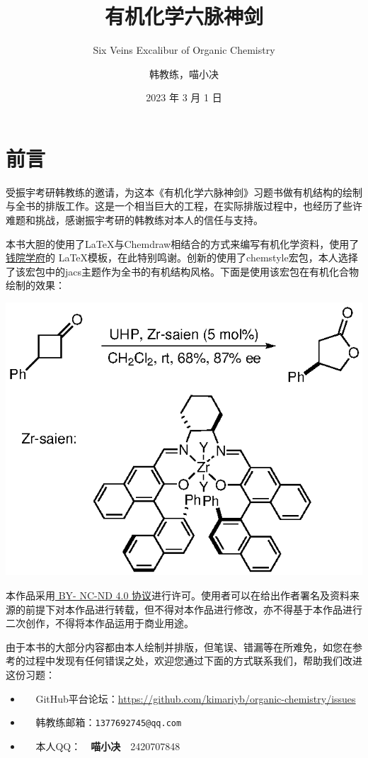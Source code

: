 \documentclass[
  10pt,
  twoside,
  openany,
  b5paper, %
  colorscheme = basic, %
]{qyxf-book}
\title{有机化学六脉神剑}
\subtitle{Six Veins Excalibur of Organic Chemistry }  %
\author{韩教练，喵小决}
\date{2023 年 3 月 1 日}
\begin{document}
\maketitle

\chapter*{前言}

受振宇考研韩教练的邀请，为这本《有机化学六脉神剑》习题书做有机结构的绘制与全书的排版工作。这是一个相当巨大的工程，在实际排版过程中，也经历了些许难题和挑战，感谢振宇考研的韩教练对本人的信任与支持。

本书大胆的使用了\LaTeX 与Chemdraw相结合的方式来编写有机化学资料，使用了\href{https://github.com/qyxf/qyxf-book}{钱院学府}的 \LaTeX 模板，在此特别鸣谢。创新的使用了chemstyle宏包，本人选择了该宏包中的jacs主题作为全书的有机结构风格。下面是使用该宏包在有机化合物绘制的效果：

\begin{scheme}[ht]
	\includegraphics{eg/eg.eps}
	
\end{scheme}

本作品采用\href{https://
	creativecommons.org/licenses/
	by-nc-nd/4.0/}{ BY-
	NC-ND 4.0 协议}进行许可。使用者可以在给出作者署名及资料来源的前提下对本作品进行转载，但不得对本作品进行修改，亦不得基于本作品进行二次创作，不得将本作品运用于商业用途。

由于本书的大部分内容都由本人绘制并排版，但笔误、错漏等在所难免，如您在参考的过程中发现有任何错误之处，欢迎您通过下面的方式联系我们，帮助我们改进这份习题：
\begin{itemize}
	\item \faGithub ~~ GitHub平台论坛：\url{https://github.com/kimariyb/organic-chemistry/issues}
	\item \faEnvelopeOpen ~~ 韩教练邮箱：\texttt{1377692745@qq.com}
	\item \faQq ~~ 
	本人QQ：~~\textbf{喵小决}~~2420707848
\end{itemize}
\end{document}
